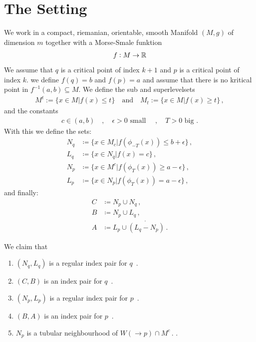 \section{The Setting}
We work in a compact, riemanian, orientable, smooth Manifold $(M,g)$ of dimension $m$ together with a Morse-Smale funktion 
\begin{align}
    f: M\to \mathbb{R}
\end{align}
We assume that $q$ is a critical point of index $k+1$ and $p$ is a critical point of index $k$. we define $f(q)=b$ and $f(p)=a$ and assume that there is no kritical point in $f^{-1}(a,b)\subseteq M$. We define the sub and superlevelsets 
\begin{align}
    M^t:=\{ x\in M | f(x)\leq t \} \quad \text{and}\quad M_t:=\{ x\in M | f(x)\geq t \} \, ,
\end{align} and the constants 
\begin{align}
    c \in (a,b) \quad , \quad \epsilon >0 \text{ small } \quad,\quad T>0 \text{ big .}
\end{align} With this we define the sets: 
\begin{align}
	N_q  & \coloneq    \{ x\in M_c |f(\phi_{-T}(x))  \leq b+ \epsilon  \}   \, ,  \\
	L_q  & \coloneq    \{ x\in N_q |f(x)             =    c            \}    \, , \\
	N_p  & \coloneq    \{ x\in M^c |f(\phi_T(x))     \geq a-\epsilon   \}    \, , \\
	L_p  & \coloneq    \{ x\in N_p |f( \phi_T(x))    =    a-\epsilon   \} \, ,
\end{align} and finally: 
\begin{align}
	C  & \coloneq  N_p \cup N_q  \, ,                     \\
	B  & \coloneq  N_p \cup L_q   \, ,                   \\
	A  & \coloneq  L_p \cup \mathring{(L_q-N_p)} \, .
\end{align}
\begin{lemma}\label{lem: the Main lemma}
    We claim that 
    \begin{enumerate}
	\item $(N_q,L_q)$ is a regular index pair for $q$\, . \label{lem: enum: 1}
	\item $(C,B)$ is an index pair for $q$\, .\label{lem: enum: 2}
	\item $(N_p,L_p)$ is a regular index pair for $p$\, .\label{lem: enum: 3}
	\item $(B,A)$ is an index pair for $p$\, .\label{lem: enum: 4}
    \item $N_p$ is a tubular neighbourhood of $W(\to p)\cap M^c\, .$ .\label{lem: enum: 5} 
\end{enumerate}
\end{lemma}
